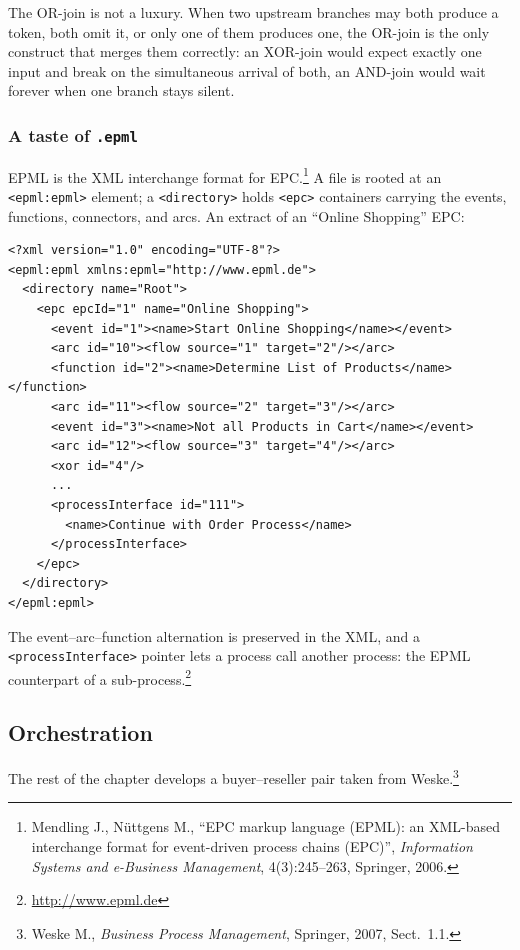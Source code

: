 The OR-join is not a luxury. When two upstream branches may both produce a token, both omit it, or only one of them produces one, the OR-join is the only construct that merges them correctly: an XOR-join would expect exactly one input and break on the simultaneous arrival of both, an AND-join would wait forever when one branch stays silent.

\subsubsection{A taste of \texttt{.epml}}

EPML is the XML interchange format for EPC.\footnote{Mendling J., N\"uttgens M., ``EPC markup language (EPML): an XML-based interchange format for event-driven process chains (EPC)'', \emph{Information Systems and e-Business Management}, 4(3):245--263, Springer, 2006.} A file is rooted at an \verb|<epml:epml>| element; a \verb|<directory>| holds \verb|<epc>| containers carrying the events, functions, connectors, and arcs. An extract of an ``Online Shopping'' EPC:
\begin{verbatim}
<?xml version="1.0" encoding="UTF-8"?>
<epml:epml xmlns:epml="http://www.epml.de">
  <directory name="Root">
    <epc epcId="1" name="Online Shopping">
      <event id="1"><name>Start Online Shopping</name></event>
      <arc id="10"><flow source="1" target="2"/></arc>
      <function id="2"><name>Determine List of Products</name></function>
      <arc id="11"><flow source="2" target="3"/></arc>
      <event id="3"><name>Not all Products in Cart</name></event>
      <arc id="12"><flow source="3" target="4"/></arc>
      <xor id="4"/>
      ...
      <processInterface id="111">
        <name>Continue with Order Process</name>
      </processInterface>
    </epc>
  </directory>
</epml:epml>
\end{verbatim}
The event--arc--function alternation is preserved in the XML, and a \verb|<processInterface>| pointer lets a process call another process: the EPML counterpart of a sub-process.\footnote{\url{http://www.epml.de}}

\subsection{Orchestration}

The rest of the chapter develops a buyer--reseller pair taken from Weske.\footnote{Weske M., \emph{Business Process Management}, Springer, 2007, Sect.~1.1.}

